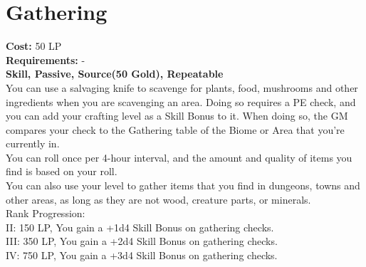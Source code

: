 \section{Gathering}\label{perk:gathering}
\textbf{Cost:} 50 LP\\
\textbf{Requirements:} -\\
\textbf{Skill, Passive, Source(50 Gold), Repeatable}\\
You can use a salvaging knife to scavenge for plants, food, mushrooms and other ingredients when you are scavenging an area.
Doing so requires a PE check, and you can add your crafting level as a Skill Bonus to it.
When doing so, the GM compares your check to the Gathering table of the Biome or Area that you're currently in.\\
You can roll once per 4-hour interval, and the amount and quality of items you find is based on your roll.\\
You can also use your level to gather items that you find in dungeons, towns and other areas, as long as they are not wood, creature parts, or minerals.
\\
Rank Progression:\\
II: 150 LP, You gain a +1d4 Skill Bonus on gathering checks.\\
III: 350 LP, You gain a +2d4 Skill Bonus on gathering checks.\\
IV: 750 LP, You gain a +3d4 Skill Bonus on gathering checks.\\